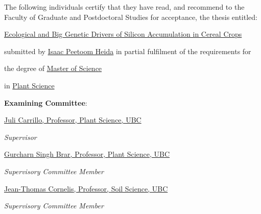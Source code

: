 \thispagestyle{plain}
\setcounter{page}{2}
{
\vspace{1cm}

\noindent The following individuals certify that they have read, and recommend to the Faculty of Graduate and Postdoctoral Studies for acceptance, the thesis entitled:

\vspace{1cm}

\noindent \uline{Ecological and Big Genetic Drivers of Silicon Accumulation in Cereal Crops\hfill}

\vspace{1cm}

\noindent submitted by
\noindent \uline{Isaac Peetoom Heida\hfill}
\noindent in partial fulfilment of the requirements for 

\vspace{1cm}
\noindent the degree of \uline{Master of Science\hfill}

\vspace{1cm}
\noindent in \uline{Plant Science\hfill}

\vspace{1cm}

\noindent \textbf{Examining Committee}:


\noindent \uline{Juli Carrillo, Professor, Plant Science, UBC\hfill}


\noindent \textit{Supervisor}

\vspace{1cm}

\noindent \uline{Gurcharn Singh Brar, Professor, Plant Science, UBC\hfill}


\noindent \textit{Supervisory Committee Member}

\vspace{1cm}

\noindent \uline{Jean-Thomas Cornelis, Professor, Soil Science, UBC\hfill}


\noindent \textit{Supervisory Committee Member}
}
